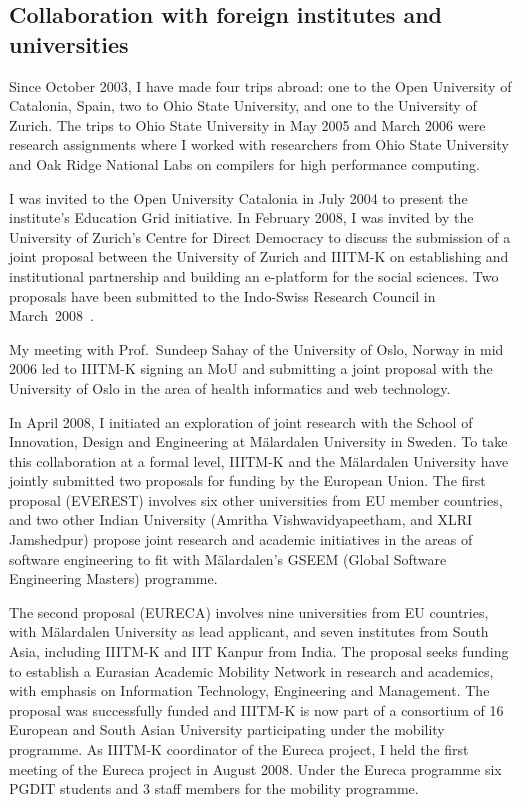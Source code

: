 \documentclass[titlepage, %
11pt, 
]{article}
\begin{document}
\subsection{Collaboration with foreign institutes and  universities}
\label{sec:foreign}
Since October 2003, I have made four trips abroad: one to
the Open University of Catalonia, Spain, two to Ohio State
University, and one to the University of Zurich.  The trips
to Ohio State University in May 2005 and March 2006 were
research assignments where I worked with researchers from
Ohio State University and Oak Ridge National Labs on
compilers for high performance computing.

I was invited to the Open University Catalonia in July 2004
to present the institute's Education Grid initiative.  In
February 2008, I was invited by the University of Zurich's
Centre for Direct Democracy to discuss the submission of a
joint proposal between the University of Zurich and IIITM-K
on establishing and institutional partnership and building
an e-platform for the social sciences.  Two proposals have
been submitted to the Indo-Swiss Research Council in
March~2008~\cite{indo-swiss-jrp-2008,indo-swiss-ipp-2008}.

My meeting with Prof.~Sundeep Sahay of the University of
Oslo, Norway in mid 2006 led to IIITM-K signing an MoU and
submitting a joint proposal with the University of Oslo in
the area of health informatics and web technology.

In April 2008, I initiated an exploration of joint research
with the School of Innovation, Design and Engineering at
M\"alardalen University in Sweden.  To take this
collaboration at a formal level, IIITM-K and the
M\"alardalen University have jointly submitted two proposals
for funding by the European Union.  The first proposal
(EVEREST) involves six other universities from EU member
countries, and two other Indian University (Amritha
Vishwavidyapeetham, and XLRI Jamshedpur) propose joint
research and academic initiatives in the areas of software
engineering to fit with M\"alardalen's GSEEM (Global
Software Engineering Masters) programme.  

The second proposal (EURECA) involves nine universities from
EU countries, with M\"alardalen University as lead
applicant, and seven institutes from South Asia, including
IIITM-K and IIT Kanpur from India\cite{eureca-2008}.  The
proposal seeks funding to establish a Eurasian Academic
Mobility Network in research and academics, with emphasis on
Information Technology, Engineering and Management.  The
proposal was successfully funded and IIITM-K is now part of
a consortium of 16 European and South Asian University
participating under the mobility programme.  As IIITM-K
coordinator of the Eureca project, I held the first meeting
of the Eureca project in August 2008.  Under the Eureca
programme six PGDIT students and 3 staff members for the
mobility programme.
\end{document}

